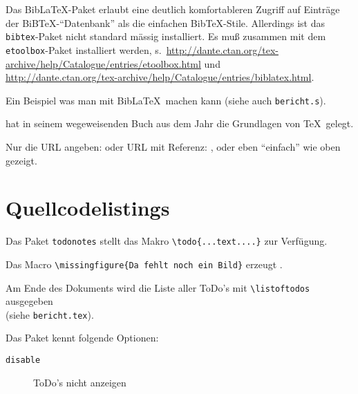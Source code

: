Das Bib\LaTeX-Paket erlaubt eine deutlich komfortableren Zugriff auf Einträge der
BiB\TeX-"`Datenbank"' als die einfachen Bib\TeX-Stile. Allerdings ist das \texttt{bibtex}-Paket
nicht standard mässig installiert. Es muß zusammen mit dem \texttt{etoolbox}-Paket installiert
werden, s.\
\url{http://dante.ctan.org/tex-archive/help/Catalogue/entries/etoolbox.html} und\\
\url{http://dante.ctan.org/tex-archive/help/Catalogue/entries/biblatex.html}.


Ein Beispiel was man mit Bib\LaTeX\ machen kann (siehe auch \texttt{bericht.s}).

 hat in seinem wegeweisenden Buch
 aus dem Jahr \citeyear{knuth.1984a}
die Grundlagen von \TeX\ gelegt.

Nur die URL angeben:  oder URL mit Referenz:
\citeurlref{dante.2010a}, oder eben "`einfach"' wie oben gezeigt.


\section{Quellcodelistings}




Das Paket \texttt{todonotes} stellt das Makro
\verb+\todo{...text....}+ zur Verfügung.

Das Macro \verb++ erzeugt
\missingfigure{Da fehlt noch ein Bild}.


Am Ende des Dokuments wird die Liste aller ToDo's mit \verb+\listoftodos+ ausgegeben\\
(siehe \texttt{bericht.tex}).

\noindent
Das Paket kennt folgende Optionen:
\begin{description}
\item[\texttt{disable}] ToDo's nicht anzeigen
\end{description}


